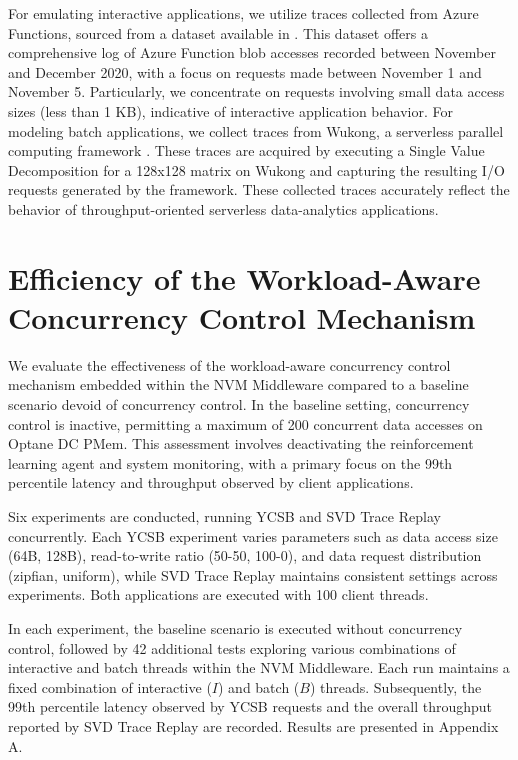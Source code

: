 For emulating interactive applications, we utilize traces collected from Azure Functions, sourced from a dataset available in \cite{GitHubAz35:online}. This dataset offers a comprehensive log of Azure Function blob accesses recorded between November and December 2020, with a focus on requests made between November 1 and November 5. Particularly, we concentrate on requests involving small data access sizes (less than 1 KB), indicative of interactive application behavior. For modeling batch applications, we collect traces from Wukong, a serverless parallel computing framework \cite{carver2020wukong}. These traces are acquired by executing a Single Value Decomposition for a 128x128 matrix on Wukong and capturing the resulting I/O requests generated by the framework. These collected traces accurately reflect the behavior of throughput-oriented serverless data-analytics applications.


\section{Efficiency of the Workload-Aware Concurrency Control Mechanism}

We evaluate the effectiveness of the workload-aware concurrency control mechanism embedded within the NVM Middleware compared to a baseline scenario devoid of concurrency control. In the baseline setting, concurrency control is inactive, permitting a maximum of 200 concurrent data accesses on Optane DC PMem. This assessment involves deactivating the reinforcement learning agent and system monitoring, with a primary focus on the 99th percentile latency and throughput observed by client applications.

Six experiments are conducted, running YCSB and SVD Trace Replay concurrently. Each YCSB experiment varies parameters such as data access size (64B, 128B), read-to-write ratio (50-50, 100-0), and data request distribution (zipfian, uniform), while SVD Trace Replay maintains consistent settings across experiments. Both applications are executed with 100 client threads.

In each experiment, the baseline scenario is executed without concurrency control, followed by 42 additional tests exploring various combinations of interactive and batch threads within the NVM Middleware. Each run maintains a fixed combination of interactive ($I$) and batch ($B$) threads. Subsequently, the 99th percentile latency observed by YCSB requests and the overall throughput reported by SVD Trace Replay are recorded. Results are presented in Appendix A.

